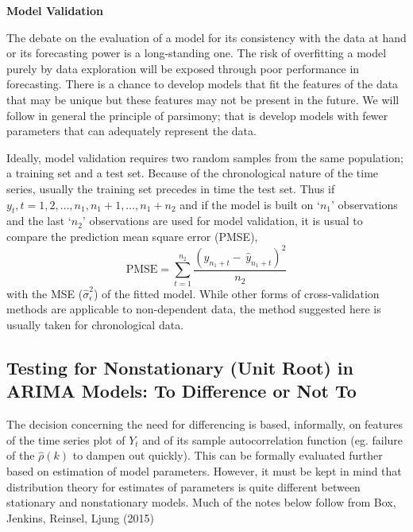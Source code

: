 \noindent \textbf{Model Validation} \twomedskip


The debate on the evaluation of a model for its consistency with the data at hand or its forecasting power is a long-standing one. The risk of overfitting a model purely by data exploration will be exposed through poor performance in forecasting. There is a chance to develop models that fit the features of the data that may be unique but these features may not be present in the future. We will follow in general the principle of parsimony; that is develop models with fewer parameters that can adequately represent the data. 


Ideally, model validation requires two random samples from the same population; a training set and a test set. Because of the chronological nature of the time series, usually the training set precedes in time the test set. Thus if $y_t, t= 1,2, \ldots,n_1, n_1+1, \ldots, n_1+n_2$ and if the model is built on `$n_1$' observations and the last `$n_2$' observations are used for model validation, it is usual to compare the prediction mean square error (PMSE),
	\begin{equation} \label{eqn:pmse}
	\text{PMSE} = \sum_{t=1}^{n_2} \frac{(y_{n_1+t} - \,\hat{y}_{n_1+t})^2}{n_2}
	\end{equation}
with the MSE ($\hat{\sigma}_\epsilon^2$) of the fitted model. While other forms of cross-validation methods are applicable to non-dependent data, the method suggested here is usually taken for chronological data.



\subsection{Testing for Nonstationary (Unit Root) in ARIMA Models: To Difference or Not To \label{sec:diffornot}} 


The decision concerning the need for differencing is based, informally, on features of the time series plot of $Y_t$ and of its sample autocorrelation function (eg. failure of the $\hat{\rho}(k)$ to dampen out quickly). This can be formally evaluated further based on estimation of model parameters. However, it must be kept in mind that distribution theory for estimates of parameters is quite different between stationary and nonstationary models. Much of the notes below follow from Box, Jenkins, Reinsel, Ljung (2015)~\cite{ljung15}


